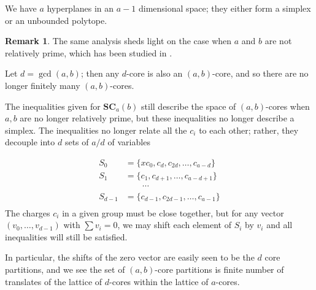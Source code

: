 \documentclass{amsart}[12pt]
\theoremstyle{definition}
\newtheorem{remark}[dummy]{Remark}
\newcommand{\DP}{\mathcal{DP}}
\newcommand{\SC}{\mathbf{SC}}
\begin{document}
We have $a$ hyperplanes in an $a-1$ dimensional space; they either
form a simplex or an unbounded polytope.



\begin{remark}  The same analysis sheds light on the case when $a$ and
  $b$ are not relatively prime, which has been studied in \cite{AKS}.

Let $d=\gcd(a,b)$; then any $d$-core is also an $(a,b)$-core, and so
there are no longer finitely many $(a,b)$-cores.

The inequalities given for $\SC_a(b)$ still describe the space of
$(a,b)$-cores when $a,b$ are no longer relatively prime, but these
inequalities no longer describe a simplex.  The inequalities no longer
relate all the $c_i$ to each other; rather, they decouple into $d$ sets of $a/d$ of variables

\begin{align*}
S_0 & =\{xc_0, c_d, c_{2d},\dots, c_{a-d}\} \\
 S_1& =\{c_1,c_{d+1},\dots, c_{a-d+1}\} \\
& \quad \quad \cdots \\
S_{d-1}&=\{c_{d-1}, c_{2d-1},\dots, c_{a-1}\} \\
\end{align*}
The charges $c_i$ in a given group must be close together, but for any
vector $(v_0,\dots, v_{d-1})$ with $\sum v_i=0$, we may shift each
element of $S_i$ by $v_i$ and all inequalities will still be satisfied.

In particular, the shifts of the zero vector are easily seen to be the
$d$ core partitions, and we see the set of $(a,b)$-core partitions is
finite number of translates of the lattice of $d$-cores within the
lattice of $a$-cores.




\end{remark}



\end{document}
